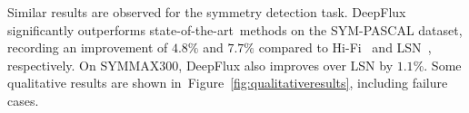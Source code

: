 \documentclass[10pt,twocolumn,letterpaper]{article}
\def\sota{state-of-the-art}
\newcommand{\reffig}[1]{Figure~\ref{#1}}
\begin{document}
Similar results are observed for the symmetry detection task.
DeepFlux significantly outperforms \sota\ methods on the SYM-PASCAL dataset, recording an improvement of $4.8\%$ and $7.7\%$ compared to Hi-Fi~\cite{zhao2018hifi} and LSN~\cite{liu2018lsn}, respectively.
On SYMMAX300, DeepFlux also improves over LSN by $1.1\%$.
Some qualitative results are shown in~\reffig{fig:qualitativeresults}, including failure cases.

\begin{figure} \centering
{}
\end{figure}
\end{document}
